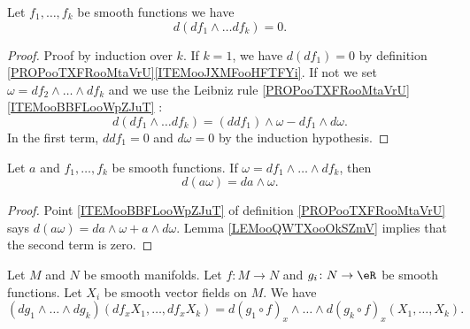 \begin{lemma}		\label{LEMooQWTXooOkSZmV}
	Let \( f_1,\ldots,f_k\) be smooth functions we have
	\begin{equation}
		d(df_1\wedge\ldots df_k)=0.
	\end{equation}
\end{lemma}

\begin{proof}
	Proof by induction over \( k\). If \( k=1\), we have \( d(df_1)=0\) by definition \ref{PROPooTXFRooMtaVrU}\ref{ITEMooJXMFooHFTFYi}. If not we set \( \omega=df_2\wedge\ldots \wedge df_k\) and we use the Leibniz rule \ref{PROPooTXFRooMtaVrU}\ref{ITEMooBBFLooWpZJuT} :
	\begin{equation}
		d(df_1\wedge\ldots df_k)=(ddf_1)\wedge\omega-df_1\wedge d\omega.
	\end{equation}
	In the first term, \( ddf_1=0\) and \( d\omega=0\) by the induction hypothesis.
\end{proof}


\begin{lemma}		\label{LEMooAONJooDgEJjA}
	Let \( a\) and \( f_1,\ldots,f_k\) be smooth functions. If \( \omega=df_1\wedge\ldots\wedge df_k\), then
	\begin{equation}
		d(a\omega)=da\wedge \omega.
	\end{equation}
\end{lemma}

\begin{proof}
	Point \ref{ITEMooBBFLooWpZJuT} of definition \ref{PROPooTXFRooMtaVrU} says \( d(a\omega)=da\wedge \omega+a\wedge d\omega\). Lemma \ref{LEMooQWTXooOkSZmV} implies that the second term is zero.
\end{proof}

\begin{proposition}		\label{PROPooINQYooXZcfou}
	Let \( M\) and \( N\) be smooth manifolds. Let \(f \colon M\to N  \) and \(g_i \colon N\to \eR  \) be smooth functions. Let \( X_i\) be smooth vector fields on \( M\). We have
	\begin{equation}
		(dg_1\wedge\ldots\wedge dg_k)(df_xX_1,\ldots,df_xX_k)=d(g_1\circ f)_x\wedge\ldots \wedge d(g_k\circ f)_x(X_1,\ldots,X_k).
	\end{equation}
\end{proposition}

